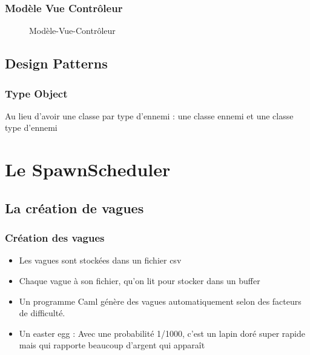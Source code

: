 \documentclass[pdf]{beamer}
\begin{document}
\begin{frame}
  \frametitle{Mod\`ele Vue Contr\^oleur}
  \begin{figure}[h]
    \centering
    \caption{Modèle-Vue-Contrôleur}
  \end{figure}
\end{frame}

\subsection{Design Patterns}

\begin{frame}
  \frametitle{Type Object}
  Au lieu d'avoir une classe par type d'ennemi : une classe ennemi et une classe
  type d'ennemi
\end{frame}

\section{Le SpawnScheduler}

\subsection{La création de vagues}
\begin{frame}
    \frametitle{Création des vagues}
    \begin{itemize}
        \item Les vagues sont stockées dans un fichier csv
        \item Chaque vague à son fichier, qu'on lit pour stocker dans un buffer
        \item Un programme Caml génère des vagues automatiquement selon des
            facteurs de difficulté.
        \item Un easter egg : Avec une probabilité 1/1000, c'est un lapin doré
            super rapide mais qui rapporte beaucoup d'argent qui apparaît
    \end{itemize}
\end{frame}
\end{document}
